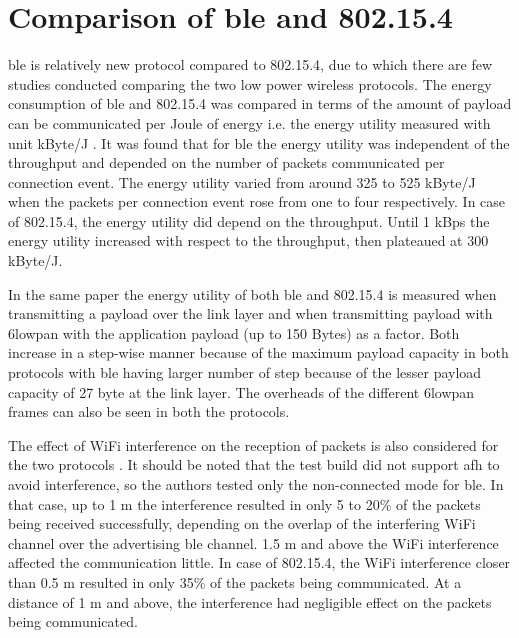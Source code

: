 \section{Comparison of \gls{ble} and 802.15.4}

\gls{ble} is relatively new protocol compared to 802.15.4, due to which there are few studies conducted comparing the two low power wireless protocols. The energy consumption of \gls{ble} and 802.15.4 was compared in terms of the amount of payload can be communicated per Joule of energy i.e. the energy utility measured with unit kByte/J \cite{Siekkinen2012}. It was found that for \gls{ble} the energy utility was independent of the throughput and depended on the number of packets communicated per connection event. The energy utility varied from around 325 to 525 kByte/J when the packets per connection event rose from one to four respectively. In case of 802.15.4, the energy utility did depend on the throughput. Until 1 kBps the energy utility increased with respect to the throughput, then plateaued at 300 kByte/J. 

In the same paper \cite{Siekkinen2012} the energy utility of both \gls{ble} and 802.15.4 is measured when transmitting a payload over the link layer and when transmitting payload with \gls{6lowpan} with the application payload (up to 150 Bytes) as a factor. Both increase in a step-wise manner because of the maximum payload capacity in both protocols with \gls{ble} having larger number of step because of the lesser payload capacity of 27 byte at the link layer. The overheads of the different \gls{6lowpan} frames can also be seen in both the protocols. 

The effect of WiFi interference on the reception of packets is also considered for the two protocols \cite{Siekkinen2012}. It should be noted that the test build did not support \gls{afh} to avoid interference, so the authors tested only the non-connected mode for \gls{ble}. In that case, up to 1 m the interference resulted in only 5 to 20\% of the packets being received successfully, depending on the overlap of the interfering WiFi channel over the advertising \gls{ble} channel. 1.5 m and above the WiFi interference affected the communication little. In case of 802.15.4, the WiFi interference closer than 0.5 m resulted in only 35\% of the packets being communicated. At a distance of 1 m and above, the interference had negligible effect on the packets being communicated.

